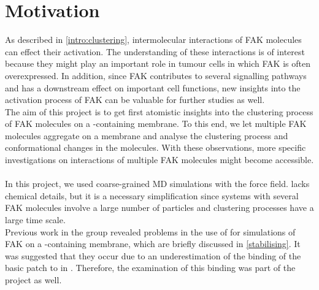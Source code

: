 \chapter{Motivation}
As described in \autoref{intro:clustering}, intermolecular interactions of FAK molecules can effect their activation. The understanding of these interactions is of interest because they might play an important role in tumour cells in which FAK is often overexpressed. In addition, since FAK contributes to several signalling pathways and has a downstream effect on important cell functions, new insights into the activation process of FAK can be valuable for further studies as well.\\
The aim of this project is to get first atomistic insights into the clustering process of FAK molecules on a \pip{}-containing membrane. To this end, we let multiple FAK molecules aggregate on a membrane and analyse the clustering process and conformational changes in the molecules. With these observations, more specific investigations on interactions of multiple FAK molecules might become accessible.\\
\\
In this project, we used coarse-grained MD simulations with the \martini{} force field. \martini{} lacks chemical details, but it is a necessary simplification since systems with several FAK molecules involve a large number of particles and clustering processes have a large time scale.\\
Previous work in the group revealed problems in the use of \martini{} for simulations of FAK on a \pip{}-containing membrane, which are briefly discussed in \autoref{stabilising}. It was suggested that they occur due to an underestimation of the binding of the basic patch to \pip{} in \martini{}. Therefore, the examination of this binding was part of the project as well.
